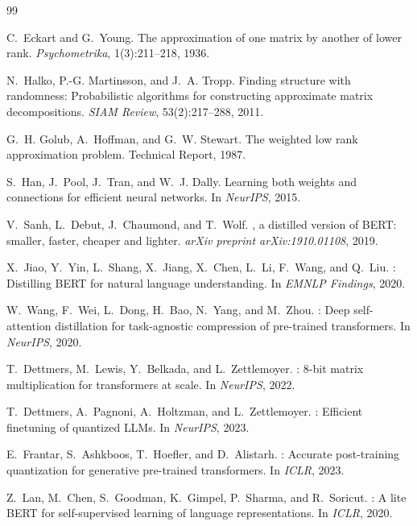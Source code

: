 \begin{thebibliography}{99}

C.~Eckart and G.~Young.
\newblock The approximation of one matrix by another of lower rank.
\newblock \emph{Psychometrika}, 1(3):211--218, 1936.

N.~Halko, P.-G. Martinsson, and J.~A. Tropp.
\newblock Finding structure with randomness: Probabilistic algorithms for constructing approximate matrix decompositions.
\newblock \emph{SIAM Review}, 53(2):217--288, 2011.

G.~H. Golub, A.~Hoffman, and G.~W. Stewart.
\newblock The weighted low rank approximation problem.
\newblock Technical Report, 1987.

S.~Han, J.~Pool, J.~Tran, and W.~J. Dally.
\newblock Learning both weights and connections for efficient neural networks.
\newblock In \emph{NeurIPS}, 2015.

V.~Sanh, L.~Debut, J.~Chaumond, and T.~Wolf.
, a distilled version of {BERT}: smaller, faster, cheaper and lighter.
\newblock \emph{arXiv preprint arXiv:1910.01108}, 2019.

X.~Jiao, Y.~Yin, L.~Shang, X.~Jiang, X.~Chen, L.~Li, F.~Wang, and Q.~Liu.
: Distilling {BERT} for natural language understanding.
\newblock In \emph{EMNLP Findings}, 2020.

W.~Wang, F.~Wei, L.~Dong, H.~Bao, N.~Yang, and M.~Zhou.
: Deep self-attention distillation for task-agnostic compression of pre-trained transformers.
\newblock In \emph{NeurIPS}, 2020.

T.~Dettmers, M.~Lewis, Y.~Belkada, and L.~Zettlemoyer.
: 8-bit matrix multiplication for transformers at scale.
\newblock In \emph{NeurIPS}, 2022.

T.~Dettmers, A.~Pagnoni, A.~Holtzman, and L.~Zettlemoyer.
: Efficient finetuning of quantized {LLMs}.
\newblock In \emph{NeurIPS}, 2023.

E.~Frantar, S.~Ashkboos, T.~Hoefler, and D.~Alistarh.
: Accurate post-training quantization for generative pre-trained transformers.
\newblock In \emph{ICLR}, 2023.

Z.~Lan, M.~Chen, S.~Goodman, K.~Gimpel, P.~Sharma, and R.~Soricut.
: A lite {BERT} for self-supervised learning of language representations.
\newblock In \emph{ICLR}, 2020.


\end{thebibliography}
